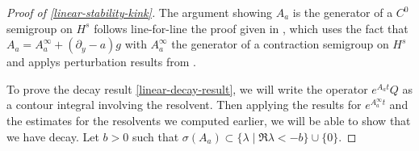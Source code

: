 \begin{proof}[Proof of \cref{linear-stability-kink}]
	The argument showing \(A_a\) is the generator of a \(C^0\) semigroup on \(H^s\) follows line-for-line the proof given in \cite[Thm.~4.2]{pego1994asymptotic}, which uses the fact that \(A_a = A_a^\infty + (\partial_y - a) g\) with \(A_a^\infty\) the generator of a contraction semigroup on \(H^s\) and applys perturbation results from \cite{kato2013perturbation}.
	
	To prove the decay result \cref{linear-decay-result}, we will write the operator \(e^{A_at} Q\) as a contour integral involving the resolvent. Then applying the results for \(e^{A_a^\infty t}\) and the estimates for the resolvents we computed earlier, we will be able to show that we have decay. Let \(b> 0\) such that \(\sigma(A_a)  \subset \{\lambda \mid \Re \lambda < - b\} \cup \{0\}.\)
	

\end{proof}
